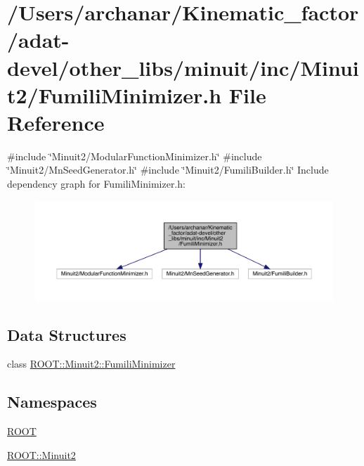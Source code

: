 \hypertarget{adat-devel_2other__libs_2minuit_2inc_2Minuit2_2FumiliMinimizer_8h}{}\section{/\+Users/archanar/\+Kinematic\+\_\+factor/adat-\/devel/other\+\_\+libs/minuit/inc/\+Minuit2/\+Fumili\+Minimizer.h File Reference}
\label{adat-devel_2other__libs_2minuit_2inc_2Minuit2_2FumiliMinimizer_8h}
{\ttfamily \#include \char`\"{}Minuit2/\+Modular\+Function\+Minimizer.\+h\char`\"{}}\newline
{\ttfamily \#include \char`\"{}Minuit2/\+Mn\+Seed\+Generator.\+h\char`\"{}}\newline
{\ttfamily \#include \char`\"{}Minuit2/\+Fumili\+Builder.\+h\char`\"{}}\newline
Include dependency graph for Fumili\+Minimizer.\+h\+:
\nopagebreak
\begin{figure}[H]
\begin{center}
\leavevmode
\includegraphics[width=350pt]{d6/d2e/adat-devel_2other__libs_2minuit_2inc_2Minuit2_2FumiliMinimizer_8h__incl}
\end{center}
\end{figure}
\subsection*{Data Structures}
\begin{DoxyCompactItemize}
\item 
class \mbox{\hyperlink{classROOT_1_1Minuit2_1_1FumiliMinimizer}{R\+O\+O\+T\+::\+Minuit2\+::\+Fumili\+Minimizer}}
\end{DoxyCompactItemize}
\subsection*{Namespaces}
\begin{DoxyCompactItemize}
\item 
 \mbox{\hyperlink{namespaceROOT}{R\+O\+OT}}
\item 
 \mbox{\hyperlink{namespaceROOT_1_1Minuit2}{R\+O\+O\+T\+::\+Minuit2}}
\end{DoxyCompactItemize}
